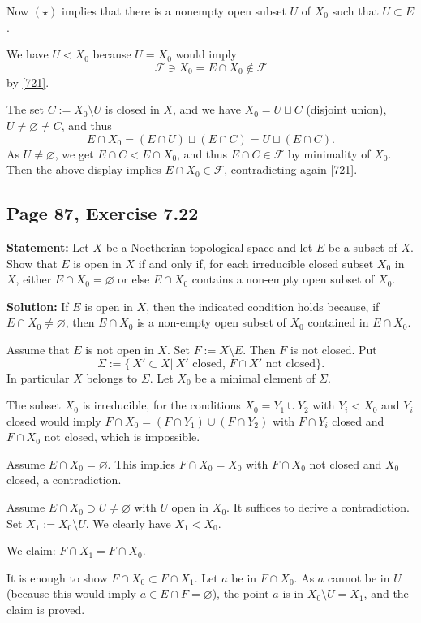 \documentclass[parskip=half,fontsize=12pt]{scrartcl}%
\begin{document}
Now $(\star)$ implies that there is a nonempty open subset $U$ of $X_0$ such that $U\subset E$. 

We have $U<X_0$ because $U=X_0$ would imply 
$$
\mathcal F\ni X_0=E\cap X_0\notin\mathcal F
$$ 
by \eqref{721}. 

The set $C:=X_0\setminus U$ is closed in $X$, and we have $X_0=U\sqcup C$ (disjoint union), $U\ne\varnothing\ne C$, and thus
$$
E\cap X_0=(E\cap U)\sqcup(E\cap C)=U\sqcup(E\cap C).
$$ 
As $U\ne\varnothing$, we get $E\cap C<E\cap X_0$, and thus $E\cap C\in\mathcal F$ by minimality of $X_0$. Then the above display implies $E\cap X_0\in\mathcal F$, contradicting again \eqref{721}.

\subsection{Page 87, Exercise 7.22}%

\textbf{Statement:} Let $X$ be a Noetherian topological space and let $E$ be a subset of $X$. Show that $E$ is open in $X$ if and only if, for each irreducible closed subset $X_0$ in $X$, either $E\cap X_0=\varnothing$ or else $E\cap X_0$ contains a non-empty open subset of $X_0$.

\textbf{Solution:} If $E$ is open in $X$, then the indicated condition holds because, if $E\cap X_0\ne\varnothing$, then $E\cap X_0$ is a non-empty open subset of $X_0$ contained in $E\cap X_0$. %

Assume that $E$ is not open in $X$. Set $F:=X\setminus E$. Then $F$ is not closed. Put 
$$
\Sigma:=\{\ X'\subset X|\ X'\text{ closed, }F\cap X'\text{ not closed}\}.
$$ 
In particular $X$ belongs to $\Sigma$. Let $X_0$ be a minimal element of $\Sigma$. 

The subset $X_0$ is irreducible, for the conditions $X_0=Y_1\cup Y_2$ with $Y_i<X_0$ and $Y_i$ closed would imply $F\cap X_0=(F\cap Y_1)\cup(F\cap Y_2)$ with $F\cap Y_i$ closed and $F\cap X_0$ not closed, which is impossible.

Assume $E\cap X_0=\varnothing$. This implies $F\cap X_0=X_0$ with $F\cap X_0$ not closed and $X_0$ closed, a contradiction.

Assume $E\cap X_0\supset U\ne\varnothing$ with $U$ open in $X_0$. It suffices to derive a contradiction. Set $X_1:=X_0\setminus U$. We clearly have $X_1<X_0$. 

We claim: $F\cap X_1=F\cap X_0$. 

It is enough to show $F\cap X_0\subset F\cap X_1$. Let $a$ be in $F\cap X_0$. As $a$ cannot be in $U$ (because this would imply $a\in E\cap F=\varnothing$), the point $a$ is in $X_0\setminus U=X_1$, and the claim is proved.
\end{document}
